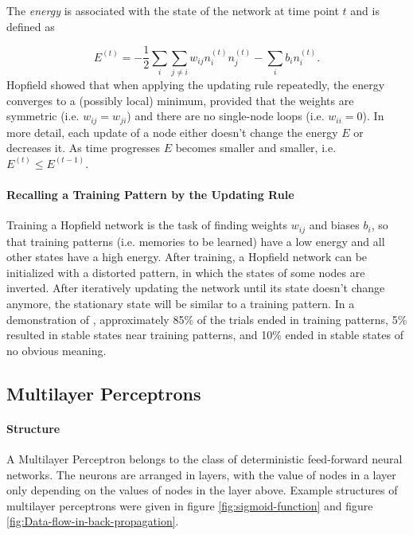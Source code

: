 The \emph{energy } is associated with the state of
the network at time point $t$ and is defined as

\begin{equation}
E^{(t)}=-\frac{1}{2}\sum_{i}\sum_{j\neq i}w_{ij}n_{i}^{(t)}n_{j}^{(t)}-\sum_{i}b_{i}n_{i}^{(t)}.\label{eq:Energy of a Hopfield network}
\end{equation}
Hopfield showed that when applying the updating rule repeatedly, the
energy converges to a (possibly local) minimum, provided that the
weights are symmetric (i.e. $w_{ij}=w_{ji}$) and there are no single-node
loops (i.e. $w_{ii}=0$). In more detail, each update of a node either
doesn't change the energy $E$ or decreases it. As time progresses
$E$ becomes smaller and smaller, i.e. $E^{(t)}\leq E^{(t-1)}$.


\paragraph{Recalling a Training Pattern by the Updating Rule}

Training a Hopfield network is the task of finding weights $w_{ij}$
and biases $b_{i}$, so that training patterns (i.e. memories to be
learned) have a low energy and all other states have a high energy.
After training, a Hopfield network can be initialized with a distorted
pattern, in which the states of some nodes are inverted. After iteratively
updating the network until its state doesn't change anymore, the stationary
state will be similar to a training pattern. In a demonstration of
\cite{Hopfield1982}, approximately 85\% of the trials ended in training
patterns, 5\% resulted in stable states near training patterns, and
10\% ended in stable states of no obvious meaning.

\subsection{Multilayer Perceptrons}

\paragraph{Structure}

A Multilayer Perceptron belongs to the class of deterministic feed-forward
neural networks. The neurons are arranged in layers, with the value
of nodes in a layer only depending on the values of nodes in the layer
above. Example structures of multilayer perceptrons were given in
figure \vref{fig:sigmoid-function} and figure \vref{fig:Data-flow-in-back-propagation}.

